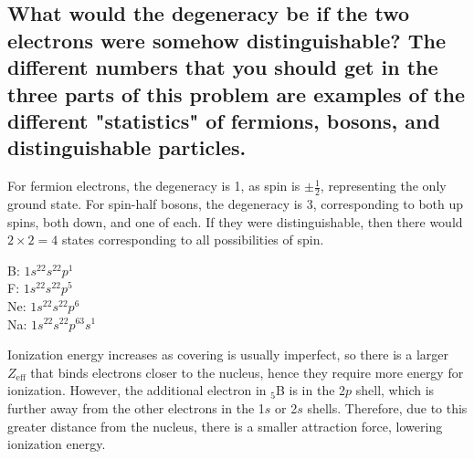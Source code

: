 \documentclass[answers]{exam}
\begin{document}
\begin{questions}
\begin{parts}
	\part{What would the degeneracy be if the two electrons were somehow distinguishable? The different numbers that you should get in the three parts of this problem are examples of the different "statistics" of fermions, bosons, and distinguishable particles.}
\end{parts}

\begin{solution}
	For fermion electrons, the degeneracy is 1, as spin is $\pm\frac{1}{2}$, representing the only ground state. For spin-half bosons, the degeneracy is 3, corresponding to both up spins, both down, and one of each. If they were distinguishable, then there would $2\times2=4$ states corresponding to all possibilities of spin.
\end{solution}


\begin{solution}
	B: $1s^22s^22p^1$ \\
	F: $1s^22s^22p^5$ \\
	Ne: $1s^22s^22p^6$ \\
	Na: $1s^22s^22p^63s^1$
\end{solution}


\begin{solution}
	Ionization energy increases as covering is usually imperfect, so there is a larger $Z_{\text{eff}}$ that binds electrons closer to the nucleus, hence they require more energy for ionization. However, the additional electron in $_5$B is in the 2$p$ shell, which is further away from the other electrons in the 1$s$ or 2$s$ shells. Therefore, due to this greater distance from the nucleus, there is a smaller attraction force, lowering ionization energy.
\end{solution}



\end{questions}
\end{document}
